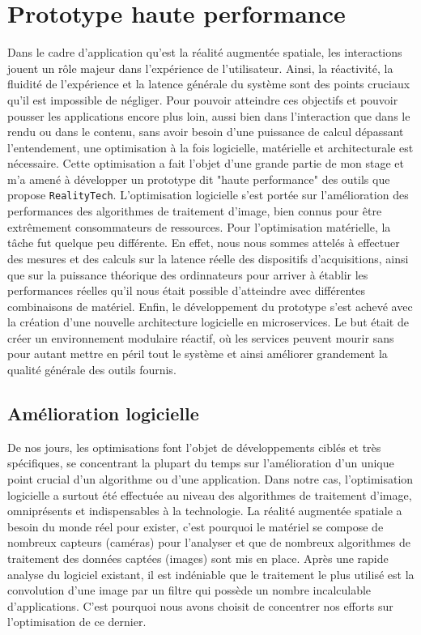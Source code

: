 \chapter{Prototype haute performance}
\label{chap:protoHP}

Dans le cadre d'application qu'est la réalité augmentée spatiale, les interactions jouent un rôle majeur dans l'expérience de l'utilisateur. Ainsi, la réactivité, la fluidité de l'expérience et la latence générale du système sont des points cruciaux qu'il est impossible de négliger. Pour pouvoir atteindre ces objectifs et pouvoir pousser les applications encore plus loin, aussi bien dans l'interaction que dans le rendu ou dans le contenu, sans avoir besoin d'une puissance de calcul dépassant l'entendement, une optimisation à la fois logicielle, matérielle et architecturale est nécessaire. 
Cette optimisation a fait l'objet d'une grande partie de mon stage et m'a amené à développer un prototype dit "haute performance" des outils que propose \texttt{RealityTech}. L'optimisation logicielle s'est portée sur l'amélioration des performances des algorithmes de traitement d'image, bien connus pour être extrêmement consommateurs de ressources. Pour l'optimisation matérielle, la tâche fut quelque peu différente. En effet, nous nous sommes attelés à effectuer des mesures et des calculs sur la latence réelle des dispositifs d'acquisitions, ainsi que sur la puissance théorique des ordinnateurs pour arriver à établir les performances réelles qu'il nous était possible d'atteindre avec différentes combinaisons de matériel. Enfin, le développement du prototype s'est achevé avec la création d'une nouvelle architecture logicielle en microservices\cite{dmitry2014micro}. Le but était de créer un environnement modulaire réactif, où les services peuvent mourir sans pour autant mettre en péril tout le système et ainsi améliorer grandement la qualité générale des outils fournis.

\section{Amélioration logicielle}
\label{sec:hpsoft}
De nos jours, les optimisations font l'objet de développements ciblés et très spécifiques, se concentrant la plupart du temps sur l'amélioration d'un unique point crucial d'un algorithme ou d'une application. Dans notre cas, l'optimisation logicielle a surtout été effectuée au niveau des algorithmes de traitement d'image, omniprésents et indispensables à la technologie. La réalité augmentée spatiale a besoin du monde réel pour exister, c'est pourquoi le matériel se compose de nombreux capteurs (caméras) pour l'analyser et que de nombreux algorithmes de traitement des données captées (images) sont mis en place. 
Après une rapide analyse du logiciel existant, il est indéniable que le traitement le plus utilisé est la convolution d'une image par un filtre qui possède un nombre incalculable d'applications. C'est pourquoi nous avons choisit de concentrer nos efforts sur l'optimisation de ce dernier.

